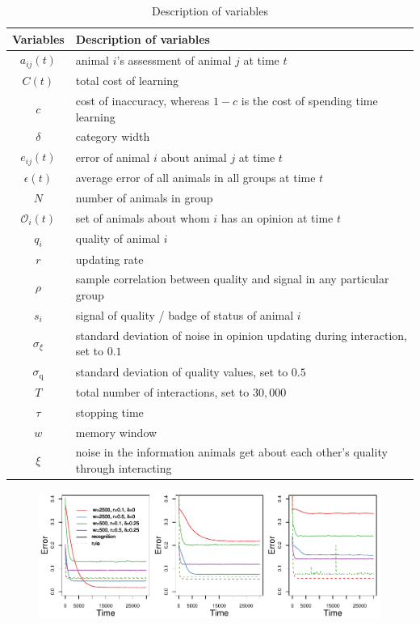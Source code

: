 %
\begin {table}[ht]
\caption {Description of variables} \label{tab:vars} 
\begin{tabular}{cl}

 Variables & Description of variables \\
\midrule 
$a_{ij}(t)$ & animal $i$'s assessment of animal $j$ at time $t$ \\
$C(t)$ & total cost of learning \\ 
$c$ & cost of inaccuracy, whereas $1-c$ is the cost of spending time learning \\ 
$\delta$ & category width \\
$e_{ij}(t)$ & error of animal $i$ about animal $j$ at time $t$\\
$\epsilon(t)$ & average error of all animals in all groups at time $t$ \\
$N$ & number of animals in group \\ 
$\mathscr{O}_i(t)$ & set of animals about whom $i$ has an opinion at time $t$\\
$q_i$ & quality of animal $i$ \\ 
$r$ & updating rate\\
$\rho$ & sample correlation between quality and signal in any particular group\\
$s_i$ & signal of quality / badge of status of animal $i$ \\ 
$\sigma_\xi$ & standard deviation of noise in opinion updating during interaction, set to $0.1$ \\
$\sigma_\text{q}$ & standard deviation of quality values, set to $0.5$ \\
$T$ & total number of interactions, set to $30,000$ \\
$\tau$ & stopping time \\
$w$ & memory window \\
$\xi$ & noise in the information animals get about each other's quality through interacting
\end{tabular}
\end {table}

\setcounter{figure}{0}
\begin{figure}
\includegraphics[width=.95\textwidth]{figures/learning_curves.pdf}
\caption{}
\end{figure}


